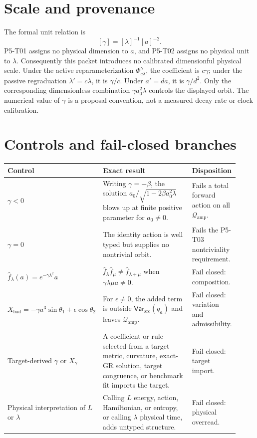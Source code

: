 \documentclass[11pt]{article}
\newcommand{\Qamp}{\mathcal Q_{\mathrm{amp}}}
\newcommand{\Var}{\mathsf{Var}_{\mathrm{src}}}
\begin{document}
\section{Scale and provenance}

The formal unit relation is
\[
 [\gamma]=[\lambda]^{-1}[a]^{-2}.
\]
P5-T01 assigns no physical dimension to \(a\), and P5-T02 assigns no physical
unit to \(\lambda\).  Consequently this packet introduces no calibrated
dimensionful physical scale.  Under the active reparameterization
\(\Phi^\gamma_{c\lambda}\), the coefficient is \(c\gamma\); under the passive
regraduation \(\lambda'=c\lambda\), it is \(\gamma/c\).  Under
\(a'=d a\), it is \(\gamma/d^2\).  Only the corresponding dimensionless
combination \(\gamma a_0^2\lambda\) controls the displayed orbit.  The
numerical value of \(\gamma\) is a proposal convention, not a measured decay
rate or clock calibration.

\section{Controls and fail-closed branches}

\begin{longtable}{p{0.23\linewidth}p{0.50\linewidth}p{0.19\linewidth}}
\toprule
Control & Exact result & Disposition\\
\midrule
\endhead
\(\gamma<0\) &
Writing \(\gamma=-\beta\), the solution
\(a_0/\sqrt{1-2\beta a_0^2\lambda}\) blows up at finite positive parameter for
\(a_0\neq0\). &
Fails a total forward action on all \(\Qamp\).\\
\(\gamma=0\) &
The identity action is well typed but supplies no nontrivial orbit. &
Fails the P5-T03 nontriviality requirement.\\
\(\widehat f_\lambda(a)=e^{-\gamma\lambda^2}a\) &
\(\widehat f_\lambda\widehat f_\mu\neq
\widehat f_{\lambda+\mu}\) when
\(\gamma\lambda\mu a\neq0\). &
Fail closed: composition.\\
\(X_{\mathrm{bad}}=-\gamma a^3\sin\theta_1+
\epsilon\cos\theta_2\) &
For \(\epsilon\neq0\), the added term is outside
\(\Var(q_a)\) and leaves \(\Qamp\). &
Fail closed: variation and admissibility.\\
Target-derived \(\gamma\) or \(X_\gamma\) &
A coefficient or rule selected from a target metric, curvature, exact-GR
solution, target congruence, or benchmark fit imports the target. &
Fail closed: target import.\\
Physical interpretation of \(L\) or \(\lambda\) &
Calling \(L\) energy, action, Hamiltonian, or entropy, or calling
\(\lambda\) physical time, adds untyped structure. &
Fail closed: physical overread.\\
\bottomrule
\end{longtable}
\end{document}
